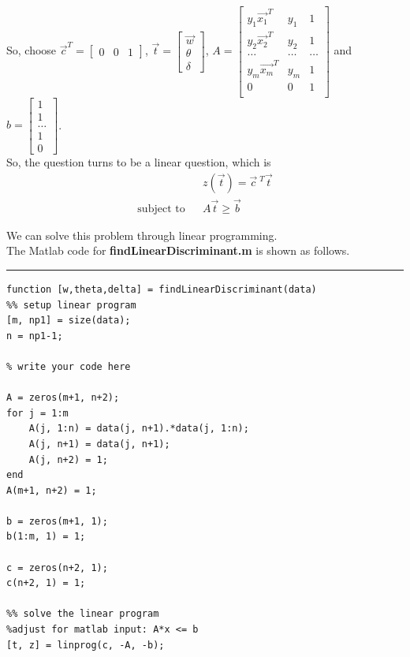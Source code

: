 \begin{enumerate}
\begin{enumerate}
\begin{enumerate}
So, choose $\vec{c}^T = \begin{bmatrix} 0 & 0 & 1 \end{bmatrix}$, $\vec{t} = \begin{bmatrix} \vec{w} \\ \theta \\ \delta \end{bmatrix}$, $A = \begin{bmatrix}
    y_1\vec{x_1}^T & y_1 & 1 \\
    y_2\vec{x_2}^T & y_2 & 1 \\
    \ldots & \ldots & \ldots \\
    y_m\vec{x_m}^T & y_m & 1 \\
    0 & 0 & 1 \\    
    \end{bmatrix}$
    and $b = \begin{bmatrix} 1 \\ 1 \\ \ldots \\ 1 \\ 0 \end{bmatrix}$.\\ 
    
So, the question turns to be a linear question, which is 
\begin{eqnarray*}
  & & z(\vec{t}) = \vec{c}~^T \vec{t} \\
\textrm{subject to} & & A \vec{t} \geq \vec{b}
\end{eqnarray*}

We can solve this problem through linear programming.\\

The Matlab code for {\bf findLinearDiscriminant.m} is shown as follows.\\
\rule{400pt}{2pt}
\begin{lstlisting}
function [w,theta,delta] = findLinearDiscriminant(data)
%% setup linear program
[m, np1] = size(data);
n = np1-1;

% write your code here

A = zeros(m+1, n+2);
for j = 1:m
    A(j, 1:n) = data(j, n+1).*data(j, 1:n);
    A(j, n+1) = data(j, n+1);
    A(j, n+2) = 1;
end
A(m+1, n+2) = 1;

b = zeros(m+1, 1);
b(1:m, 1) = 1;

c = zeros(n+2, 1);
c(n+2, 1) = 1;

%% solve the linear program
%adjust for matlab input: A*x <= b
[t, z] = linprog(c, -A, -b);


\end{lstlisting}
\end{enumerate}
\end{enumerate}
\end{enumerate}
